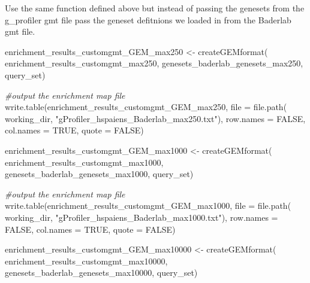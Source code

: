 \documentclass[
]{book}
\newenvironment{Shaded}{\begin{snugshade}}{\end{snugshade}}
\newcommand{\AttributeTok}[1]{\textcolor[rgb]{0.77,0.63,0.00}{#1}}
\newcommand{\CommentTok}[1]{\textcolor[rgb]{0.56,0.35,0.01}{\textit{#1}}}
\newcommand{\ConstantTok}[1]{\textcolor[rgb]{0.00,0.00,0.00}{#1}}
\newcommand{\FunctionTok}[1]{\textcolor[rgb]{0.00,0.00,0.00}{#1}}
\newcommand{\NormalTok}[1]{#1}
\newcommand{\OtherTok}[1]{\textcolor[rgb]{0.56,0.35,0.01}{#1}}
\newcommand{\StringTok}[1]{\textcolor[rgb]{0.31,0.60,0.02}{#1}}
\begin{document}
Use the same function defined above but instead of passing the genesets from the g\_profiler gmt file pass the geneset defitnions we loaded in from the Baderlab gmt file.

\begin{Shaded}
\begin{Highlighting}[]
\NormalTok{enrichment\_results\_customgmt\_GEM\_max250 }\OtherTok{\textless{}{-}} \FunctionTok{createGEMformat}\NormalTok{(}
\NormalTok{                                    enrichment\_results\_customgmt\_max250, }
\NormalTok{                                    genesets\_baderlab\_genesets\_max250, }
\NormalTok{                                    query\_set)}

\CommentTok{\#output the enrichment map file}
\FunctionTok{write.table}\NormalTok{(enrichment\_results\_customgmt\_GEM\_max250, }
                  \AttributeTok{file =} \FunctionTok{file.path}\NormalTok{(}
\NormalTok{                    working\_dir, }\StringTok{"gProfiler\_hspaiens\_Baderlab\_max250.txt"}\NormalTok{),}
                  \AttributeTok{row.names =} \ConstantTok{FALSE}\NormalTok{, }
                  \AttributeTok{col.names =} \ConstantTok{TRUE}\NormalTok{,}
                  \AttributeTok{quote =} \ConstantTok{FALSE}\NormalTok{)}
       
\NormalTok{enrichment\_results\_customgmt\_GEM\_max1000 }\OtherTok{\textless{}{-}} \FunctionTok{createGEMformat}\NormalTok{(}
\NormalTok{                                  enrichment\_results\_customgmt\_max1000,}
\NormalTok{                                  genesets\_baderlab\_genesets\_max1000, }
\NormalTok{                                  query\_set)}

\CommentTok{\#output the enrichment map file}
\FunctionTok{write.table}\NormalTok{(enrichment\_results\_customgmt\_GEM\_max1000, }
                  \AttributeTok{file =} \FunctionTok{file.path}\NormalTok{(}
\NormalTok{                    working\_dir, }\StringTok{"gProfiler\_hspaiens\_Baderlab\_max1000.txt"}\NormalTok{),}
                  \AttributeTok{row.names =} \ConstantTok{FALSE}\NormalTok{, }
                  \AttributeTok{col.names =} \ConstantTok{TRUE}\NormalTok{,}
                  \AttributeTok{quote =} \ConstantTok{FALSE}\NormalTok{)}

\NormalTok{enrichment\_results\_customgmt\_GEM\_max10000 }\OtherTok{\textless{}{-}} \FunctionTok{createGEMformat}\NormalTok{(}
\NormalTok{                                  enrichment\_results\_customgmt\_max10000,}
\NormalTok{                                  genesets\_baderlab\_genesets\_max10000, }
\NormalTok{                                  query\_set)}


\end{Highlighting}
\end{Shaded}
\end{document}
